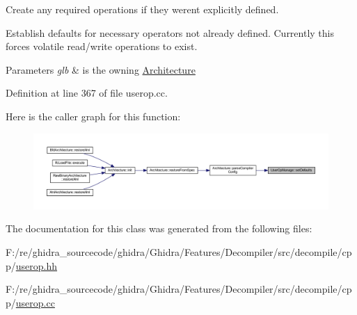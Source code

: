 Create any required operations if they weren\textquotesingle{}t explicitly defined. 

Establish defaults for necessary operators not already defined. Currently this forces volatile read/write operations to exist. 
\begin{DoxyParams}{Parameters}
{\em glb} & is the owning \mbox{\hyperlink{class_architecture}{Architecture}} \\
\hline
\end{DoxyParams}


Definition at line 367 of file userop.\+cc.

Here is the caller graph for this function\+:
\nopagebreak
\begin{figure}[H]
\begin{center}
\leavevmode
\includegraphics[width=350pt]{class_user_op_manage_ac1fd9f8f2ee822b082ef0a3b1bcae120_icgraph}
\end{center}
\end{figure}


The documentation for this class was generated from the following files\+:\begin{DoxyCompactItemize}
\item 
F\+:/re/ghidra\+\_\+sourcecode/ghidra/\+Ghidra/\+Features/\+Decompiler/src/decompile/cpp/\mbox{\hyperlink{userop_8hh}{userop.\+hh}}\item 
F\+:/re/ghidra\+\_\+sourcecode/ghidra/\+Ghidra/\+Features/\+Decompiler/src/decompile/cpp/\mbox{\hyperlink{userop_8cc}{userop.\+cc}}\end{DoxyCompactItemize}
